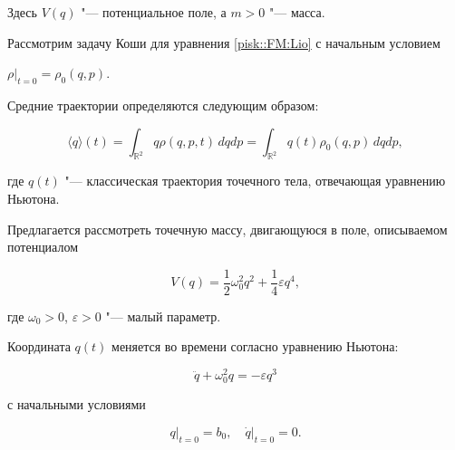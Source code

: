 Здесь $V(q)$ "--- потенциальное поле, а $m>0$ "--- масса.



Рассмотрим задачу Коши для уравнения \eqref{pisk::FM:Lio} с начальным условием



$\rho|_{t=0}=\rho_0(q,p).$


Средние траектории определяются следующим образом:

\begin{equation}

  \langle q \rangle(t) = \int_{\mathbb R^2} q \rho (q,p,t)\,dqdp=\int_{\mathbb{R}^2} q(t) \rho_0(q,p)\,dq dp,

\end{equation}

где $q(t)$ "--- классическая траектория точечного тела, отвечающая уравнению Ньютона.



\smallskip




Предлагается рассмотреть точечную массу, двигающуюся в поле, описываемом потенциалом %



$$V(q) = \dfrac 1 2 \omega^2_0 q^2 + \dfrac 1 4 \varepsilon q^4,$$


где $\omega_0 >0$, $\varepsilon >0$ "--- малый параметр. 

Координата $q(t)$ меняется во времени согласно уравнению Ньютона:

\begin{equation}

\label{pisk::FM:Duffing_init}

  \ddot{q} + \omega_0^2q = -\varepsilon q^3

\end{equation}

с начальными условиями

\begin{equation}\label{pisk::FM:init}

  q\bigl|_{t=0} = b_0, \quad \dot{q}\bigl|_{t = 0} = 0.

\end{equation}

